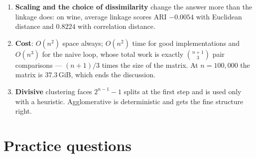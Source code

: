 \documentclass[11pt]{article}
\begin{document}
\begin{enumerate}[leftmargin=*]
    heuristic and it tends to point at small $k$ --- on iris it says $2$
    where the species say $3$.
  \item \textbf{Scaling and the choice of dissimilarity} change the answer
    more than the linkage does: on wine, average linkage scores ARI
    $-0.0054$ with Euclidean distance and $0.8224$ with correlation distance.
  \item \textbf{Cost}: $O(n^2)$ space always; $O(n^2)$ time for good
    implementations and $O(n^3)$ for the naive loop, whose total work is
    exactly $\binom{n+1}{3}$ pair comparisons --- $(n+1)/3$ times the size of
    the matrix. At $n = 100{,}000$ the matrix is $37.3$\,GiB, which ends the
    discussion.
  \item \textbf{Divisive} clustering faces $2^{n-1}-1$ splits at the first
    step and is used only with a heuristic. Agglomerative is deterministic and
    gets the fine structure right.
\end{enumerate}

\section{Practice questions}
\label{sec:practice}
\end{document}
